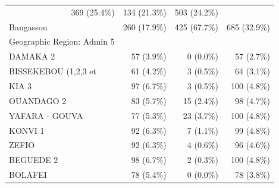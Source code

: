 \begin{table}[!h]
\begin{tabular}{llll}
  \multicolumn{1}{r}{369 (25.4\%)} &
  \multicolumn{1}{r}{134 (21.3\%)} &
  \multicolumn{1}{r}{503 (24.2\%)} \\
\multicolumn{1}{l}{\hspace{1em}Bangassou} &
  \multicolumn{1}{r}{260 (17.9\%)} &
  \multicolumn{1}{r}{425 (67.7\%)} &
  \multicolumn{1}{r}{685 (32.9\%)} \\
\multicolumn{1}{l}{Geographic Region: Admin 5} &
  \multicolumn{1}{r}{} &
  \multicolumn{1}{r}{} &
  \multicolumn{1}{r}{} \\
\multicolumn{1}{l}{\hspace{1em}DAMAKA 2} &
  \multicolumn{1}{r}{57 (3.9\%)} &
  \multicolumn{1}{r}{0 (0.0\%)} &
  \multicolumn{1}{r}{57 (2.7\%)} \\
\multicolumn{1}{l}{\hspace{1em}BISSEKEBOU (1,2,3 et} &
  \multicolumn{1}{r}{61 (4.2\%)} &
  \multicolumn{1}{r}{3 (0.5\%)} &
  \multicolumn{1}{r}{64 (3.1\%)} \\
\multicolumn{1}{l}{\hspace{1em}KIA 3} &
  \multicolumn{1}{r}{97 (6.7\%)} &
  \multicolumn{1}{r}{3 (0.5\%)} &
  \multicolumn{1}{r}{100 (4.8\%)} \\
\multicolumn{1}{l}{\hspace{1em}OUANDAGO  2} &
  \multicolumn{1}{r}{83 (5.7\%)} &
  \multicolumn{1}{r}{15 (2.4\%)} &
  \multicolumn{1}{r}{98 (4.7\%)} \\
\multicolumn{1}{l}{\hspace{1em}YAFARA - GOUVA} &
  \multicolumn{1}{r}{77 (5.3\%)} &
  \multicolumn{1}{r}{23 (3.7\%)} &
  \multicolumn{1}{r}{100 (4.8\%)} \\
\multicolumn{1}{l}{\hspace{1em}KONVI 1} &
  \multicolumn{1}{r}{92 (6.3\%)} &
  \multicolumn{1}{r}{7 (1.1\%)} &
  \multicolumn{1}{r}{99 (4.8\%)} \\
\multicolumn{1}{l}{\hspace{1em}ZEFIO} &
  \multicolumn{1}{r}{92 (6.3\%)} &
  \multicolumn{1}{r}{4 (0.6\%)} &
  \multicolumn{1}{r}{96 (4.6\%)} \\
\multicolumn{1}{l}{\hspace{1em}BEGUEDE   2} &
  \multicolumn{1}{r}{98 (6.7\%)} &
  \multicolumn{1}{r}{2 (0.3\%)} &
  \multicolumn{1}{r}{100 (4.8\%)} \\
\multicolumn{1}{l}{\hspace{1em}BOLAFEI} &
  \multicolumn{1}{r}{78 (5.4\%)} &
  \multicolumn{1}{r}{0 (0.0\%)} &
  \multicolumn{1}{r}{78 (3.8\%)} \\

\end{tabular}
\end{table}
